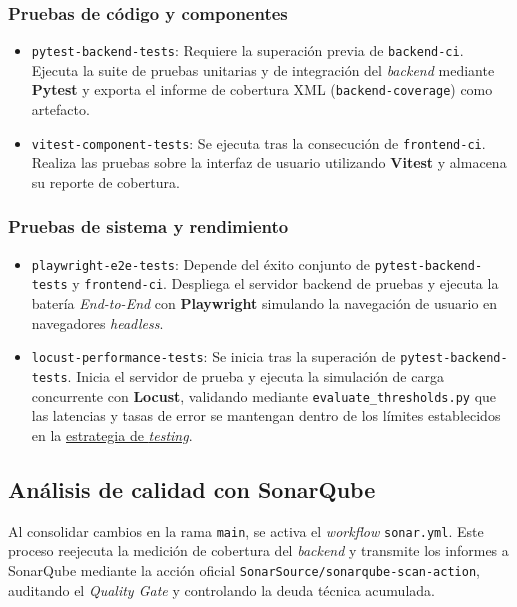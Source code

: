 \subsubsection{Pruebas de código y componentes}
\begin{itemize}
    \item \texttt{pytest-backend-tests}: Requiere la superación previa de \texttt{backend-ci}. Ejecuta la suite de pruebas unitarias y de integración del \textit{backend} mediante \textbf{Pytest} y exporta el informe de cobertura XML (\texttt{backend-coverage}) como artefacto.
    \item \texttt{vitest-component-tests}: Se ejecuta tras la consecución de \texttt{frontend-ci}. Realiza las pruebas sobre la interfaz de usuario utilizando \textbf{Vitest} y almacena su reporte de cobertura.
\end{itemize}

\subsubsection{Pruebas de sistema y rendimiento}
\begin{itemize}
    \item \texttt{playwright-e2e-tests}: Depende del éxito conjunto de \texttt{pytest-backend-tests} y \texttt{frontend-ci}. Despliega el servidor backend de pruebas y ejecuta la batería \textit{End-to-End} con \textbf{Playwright} simulando la navegación de usuario en navegadores \textit{headless}.
    \item \texttt{locust-performance-tests}: Se inicia tras la superación de \texttt{pytest-backend-tests}. Inicia el servidor de prueba y ejecuta la simulación de carga concurrente con \textbf{Locust}, validando mediante \texttt{evaluate\_thresholds.py} que las latencias y tasas de error se mantengan dentro de los límites establecidos en la \hyperref[sec:estrategia_testing]{estrategia de \textit{testing}}.
\end{itemize}

\subsection{Análisis de calidad con SonarQube}\label{subsec:sonarqube_ci}

Al consolidar cambios en la rama \texttt{main}, se activa el \textit{workflow} \texttt{sonar.yml}. Este proceso reejecuta la medición de cobertura del \textit{backend} y transmite los informes a SonarQube mediante la acción oficial \texttt{SonarSource/sonarqube-scan-action}, auditando el \textit{Quality Gate} y controlando la deuda técnica acumulada.

